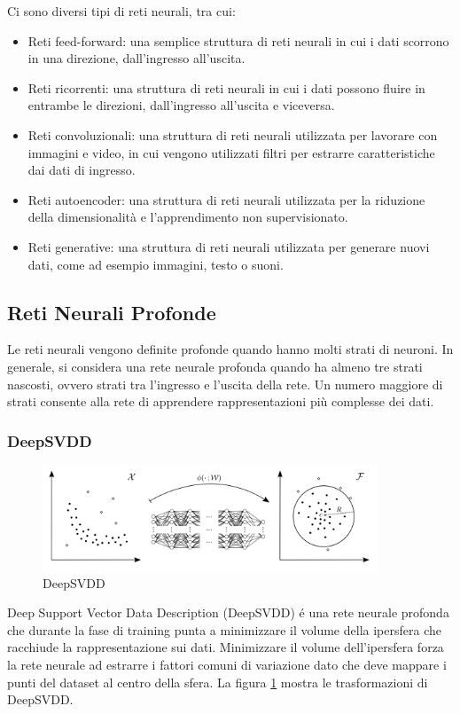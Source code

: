 Ci sono diversi tipi di reti neurali, tra cui:
\begin{itemize}
\item Reti feed-forward: una semplice struttura di reti neurali in cui i dati scorrono in una direzione, dall'ingresso all'uscita.
\item Reti ricorrenti: una struttura di reti neurali in cui i dati possono fluire in entrambe le direzioni, dall'ingresso all'uscita e viceversa.
\item  Reti convoluzionali: una struttura di reti neurali utilizzata per lavorare con immagini e video, in cui vengono utilizzati filtri per estrarre caratteristiche dai dati di ingresso.
\item Reti autoencoder: una struttura di reti neurali utilizzata per la riduzione della dimensionalità e l'apprendimento non supervisionato.
\item Reti generative: una struttura di reti neurali utilizzata per generare nuovi dati, come ad esempio immagini, testo o suoni.
\end{itemize}


\subsection{Reti Neurali Profonde}
Le reti neurali vengono definite profonde quando hanno molti strati di neuroni. In generale, si considera una rete neurale profonda quando ha almeno tre strati nascosti, ovvero strati tra l'ingresso e l'uscita della rete. Un numero maggiore di strati consente alla rete di apprendere rappresentazioni più complesse dei dati.
\subsubsection{DeepSVDD}
\begin{figure}[t]
	\centering
	\includegraphics[width=10cm, scale=1]{images/deepsvdd}
	\caption{DeepSVDD}
	\label{deepsvdd}
\end{figure}

Deep Support Vector Data Description (DeepSVDD) é una rete neurale profonda che durante la fase di training punta a minimizzare il volume della ipersfera che racchiude la rappresentazione sui dati. Minimizzare il volume dell'ipersfera forza la rete neurale ad estrarre i fattori comuni di variazione dato che deve mappare i punti del dataset al centro della sfera.  La figura \ref{deepsvdd} mostra le trasformazioni di DeepSVDD.

